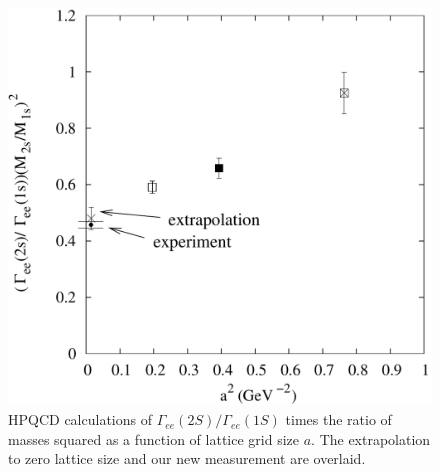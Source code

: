 \documentclass{cornell}
\begin{document}
\begin{figure}[p]
  \begin{center}
    \includegraphics[width=\linewidth]{newplots/latticespacingagain}
  \end{center}
  \caption[Comparison of our $\Gamma_{ee}(2S)/\Gamma_{ee}(1S)$ with
  the HPQCD calculation]{\label{latticespacingagain} HPQCD
  calculations of $\Gamma_{ee}(2S)/\Gamma_{ee}(1S)$ times the ratio of
  masses squared as a function of lattice grid size $a$.  The
  extrapolation to zero lattice size and our new measurement are
  overlaid.}
\end{figure}
\end{document}
